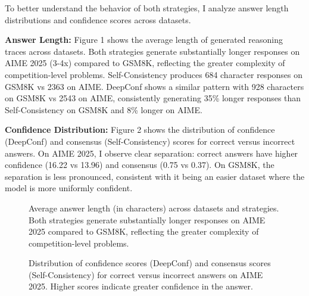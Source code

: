 \documentclass[11pt]{article}
\begin{document}
To better understand the behavior of both strategies, I analyze answer length distributions and confidence scores across datasets.

\textbf{Answer Length:} Figure 1 shows the average length of generated reasoning traces across datasets. Both strategies generate substantially longer responses on AIME 2025 (3-4x) compared to GSM8K, reflecting the greater complexity of competition-level problems. Self-Consistency produces 684 character responses on GSM8K vs 2363 on AIME. DeepConf shows a similar pattern with 928 characters on GSM8K vs 2543 on AIME, consistently generating 35\% longer responses than Self-Consistency on GSM8K and 8\% longer on AIME.

\textbf{Confidence Distribution:} Figure 2 shows the distribution of confidence (DeepConf) and consensus (Self-Consistency) scores for correct versus incorrect answers. On AIME 2025, I observe clear separation: correct answers have higher confidence (16.22 vs 13.96) and consensus (0.75 vs 0.37). On GSM8K, the separation is less pronounced, consistent with it being an easier dataset where the model is more uniformly confident.

\begin{figure}[t]
\centering
\caption{Average answer length (in characters) across datasets and strategies. Both strategies generate substantially longer responses on AIME 2025 compared to GSM8K, reflecting the greater complexity of competition-level problems.}
\label{fig:answer_length}
\end{figure}

\begin{figure}[t]
\centering
\caption{Distribution of confidence scores (DeepConf) and consensus scores (Self-Consistency) for correct versus incorrect answers on AIME 2025. Higher scores indicate greater confidence in the answer.}
\label{fig:confidence_distribution}
\end{figure}
\end{document}
